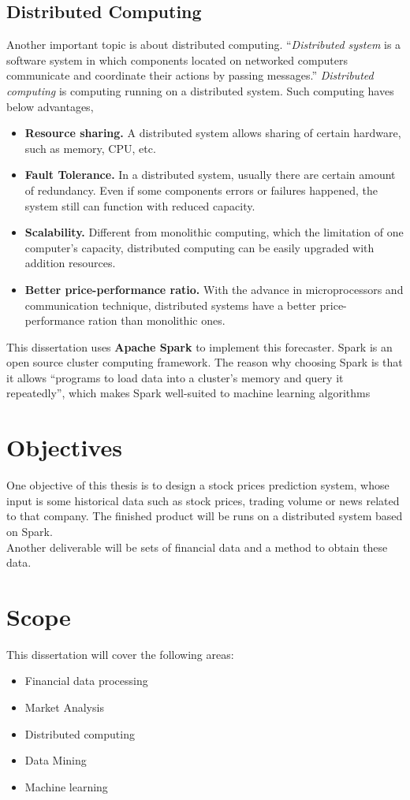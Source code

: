 \documentclass[12pt,a4paper]{scrartcl}
\begin{document}
	\subsection{Distributed Computing}
	Another important topic is about distributed computing. \enquote{\textit{Distributed system} is a software system in which components located on networked computers communicate and coordinate their actions by passing messages.}\cite{coulouris2012distributed} \textit{Distributed computing} is computing running on a distributed system. Such computing haves below advantages\cite{mahajan2013distributed},
	\begin{itemize}
		\item \textbf{Resource sharing.} A distributed system allows sharing of certain hardware, such as memory, CPU, etc. 
		\item \textbf{Fault Tolerance.} In a distributed system, usually there are certain amount of redundancy. Even if some components errors or failures happened, the system still can function with reduced capacity.
		\item \textbf{Scalability.} Different from monolithic computing, which the limitation of one computer's capacity, distributed computing can be easily upgraded with addition resources.
		\item \textbf{Better price-performance ratio.} With the advance in microprocessors and communication technique, distributed systems have a better price-performance ration than monolithic ones.
	\end{itemize}
	This dissertation uses \textbf{Apache Spark} to implement this forecaster. Spark\cite{karau2015learning} is an open source cluster computing framework. The reason why choosing Spark is that it allows \enquote{programs to load data into a cluster's memory and query it repeatedly}, which makes Spark well-suited to machine learning algorithms
	\section{Objectives}
	One objective of this thesis is to design a stock prices prediction system, whose input is some historical data such as stock prices, trading volume or news related to that company. The finished product will be runs on a distributed system based on Spark. \\
	Another deliverable will be sets of financial data and a method to obtain these data.
	\section{Scope}
	This dissertation will cover the following areas:
	\begin{itemize}
		\item Financial data processing
		\item Market Analysis
		\item Distributed computing
		\item Data Mining
		\item Machine learning
	\end{itemize} 
\end{document}
